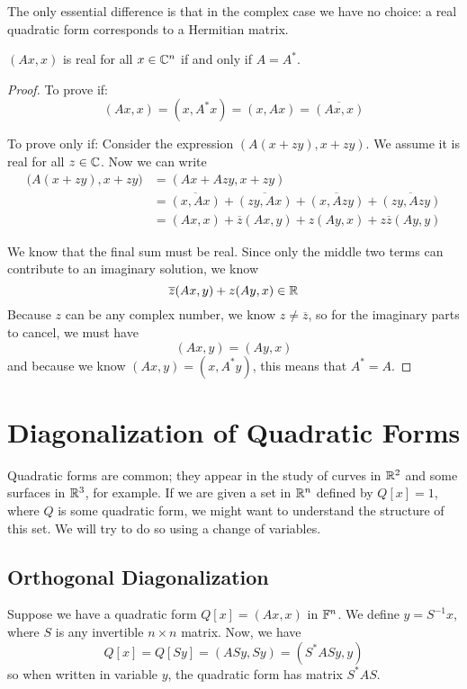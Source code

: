 The only essential difference is that in the complex case we have no choice: a real quadratic form corresponds to a Hermitian matrix. 

\begin{theorem}
$(Ax, x)$ is real for all $x \in \mathbb{C}^{n}$ if and only if $A = A^{*}$.  
\end{theorem}

\begin{proof}
To prove if: 
$$(Ax, x) = (x, A^{*} x) = (x, Ax) = \overline{(Ax, x)}$$

To prove only if: Consider the expression $(A (x + zy), x + zy)$. We assume it is real for all $z \in \mathbb{C}$. Now we can write 
$$
\begin{aligned}
\Big( A (x + zy), x + zy \Big) &= ( Ax + Azy, x + zy) \\
&= \overline{(x, Ax)} + \overline{(zy, Ax)} + \overline{(x, Azy)} + \overline{(zy, Azy)} \\ 
&= (Ax, x) + \overline{z} (Ax, y) + z (Ay, x) + z \overline{z} (Ay, y)
\end{aligned}
$$

We know that the final sum must be real. Since only the middle two terms can contribute to an imaginary solution, we know 
$$\overline{z} (Ax, y) + z (Ay, x) \in \mathbb{R}$$
Because $z$ can be any complex number, we know $z \neq \overline{z}$, so for the imaginary parts to cancel, we must have
$$(Ax, y) = (Ay, x)$$
and because we know $(Ax, y) = (x, A^{*} y)$, this means that $A^{*} = A$. 
\end{proof}

\section{Diagonalization of Quadratic Forms}

Quadratic forms are common; they appear in the study of curves in $\mathbb{R}^{2}$ and some surfaces in $\mathbb{R}^{3}$, for example. If we are given a set in $\mathbb{R}^{n}$ defined by $Q[x] = 1$, where $Q$ is some quadratic form, we might want to understand the structure of this set. We will try to do so using a change of variables. 

\subsection{Orthogonal Diagonalization}

Suppose we have a quadratic form $Q[x] = (Ax, x)$ in $\mathbb{F}^{n}$. We define $y = S^{-1} x$, where $S$ is any invertible $n \times n$ matrix. Now, we have
$$Q[x] = Q[Sy] = (ASy, Sy) = (S^{*} AS y, y)$$
so when written in variable $y$, the quadratic form has matrix $S^{*}AS$. 

